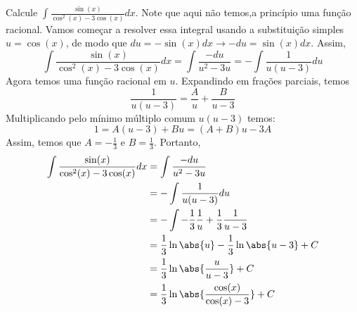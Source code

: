 \begin{example}
  Calcule \(\int \frac{\sin(x)}{\cos^2(x)-3\cos(x)}dx\).
  \solution
  Note que aqui não temos,a princípio uma função racional. Vamos começar a
  resolver essa integral usando a substituição simples $u=\cos(x)$, de modo que
  $du=-\sin(x) dx \to -du=\sin(x)dx$. Assim,
  \[
    \int \frac{\sin(x)}{\cos^2(x)-3\cos(x)}dx
    =  \int \frac{-du}{u^2-3u}
    = -\int \frac{1}{u(u-3)}du
  \]
  Agora temos uma função racional em $u$. Expandindo em frações parciais, temos
  \[
    \frac{1}{u(u-3)}
    = \frac{A}{u}+ \frac{B}{u-3}
  \]
  Multiplicando pelo mínimo múltiplo comum $u(u-3)$ temos:
  \[
    1
    = A(u-3)+Bu
    = (A+B)u-3A
  \]
  Assim, temos que $A=-\frac{1}{3}$ e $B=\frac{1}{3}$. Portanto,
  \begin{align*}
    \int \frac{\sin(x)}{\cos^2(x)-3\cos(x)}dx
    & =  \int \frac{-du}{u^2-3u} \\
    & = -\int \frac{1}{u(u-3)}du \\
    & = -\int -\frac{1}{3} \frac{1}{u}+\frac{1}{3} \frac{1}{u-3} \\
    & = \frac{1}{3} \ln\abs{u}
      - \frac{1}{3} \ln\abs{u-3} + C \\
    & = \frac{1}{3} \ln \abs{\frac{u}{u-3}} +C \\
    & = \frac{1}{3} \ln \abs{\frac{\cos(x)}{\cos(x)-3}} +C
  \end{align*}
\end{example}
